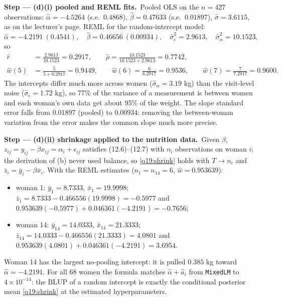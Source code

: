 \documentclass[11pt,a4paper]{article}
\numberwithin{equation}{questao}
\newcommand{\passo}[2]{\par\smallskip\noindent\textbf{Step --- #1.}~#2}
\begin{document}
\begin{sol}
\passo{(d)(i) pooled and REML fits}{Pooled OLS on the $n=427$ observations: $\hat\alpha=-4.5264$ (s.e.\ $0.4868$),
$\hat\beta=0.47633$ (s.e.\ $0.01897$), $\hat\sigma=3.6115$, as on the lecturer's page. REML for the random-intercept model:
\begin{equation*}
\hat\alpha=-4.2191\ (0.4541),\quad \hat\beta=0.46656\ (0.00934),\quad \hat\sigma_\epsilon^2=2.9613,\quad \hat\sigma_\alpha^2=10.1523,
\end{equation*}
so
\begin{align*}
\hat r&=\frac{2.9613}{10.1523}=0.2917,\qquad \hat\rho=\frac{10.1523}{10.1523+2.9613}=0.7742,\\
\hat w(5)&=\frac{5}{5+0.2917}=0.9449,\qquad \hat w(6)=\frac{6}{6.2917}=0.9536,\qquad \hat w(7)=\frac{7}{7.2917}=0.9600 .
\end{align*}
The intercepts differ much more across women ($\hat\sigma_\alpha=3.19$ kg) than the visit-level noise ($\hat\sigma_\epsilon=1.72$
kg), so 77\% of the variance of a measurement is between women and each woman's own data get about 95\% of the
weight. The slope standard error falls from $0.01897$ (pooled) to $0.00934$: removing the between-woman variation
from the error makes the common slope much more precise.}

\passo{(d)(ii) shrinkage applied to the nutrition data}{Given $\beta$, $z_{ij}=y_{ij}-\beta x_{ij}=\alpha_i+\epsilon_{ij}$
satisfies (12.6)--(12.7) with $n_i$ observations on woman $i$; the derivation of (b) never used balance, so
\eqref{q19:shrink} holds with $T\to n_i$ and $\bar z_i=\bar y_i-\beta\bar x_i$. With the REML estimates ($n_1=n_{14}=6$,
$\hat w=0.953639$):
\begin{itemize}[leftmargin=1.4em,topsep=1pt,itemsep=0pt]
\item woman 1: $\bar y_1=8.7333$, $\bar x_1=19.9998$; $\bar z_1=8.7333-0.466556(19.9998)=-0.5977$ and
$0.953639(-0.5977)+0.046361(-4.2191)=-0.7656$;
\item woman 14: $\bar y_{14}=14.0333$, $\bar x_{14}=21.3333$; $\bar z_{14}=14.0333-0.466556(21.3333)=4.0801$ and
$0.953639(4.0801)+0.046361(-4.2191)=3.6954$.
\end{itemize}
Woman 14 has the largest no-pooling intercept: it is pulled $0.385$ kg toward $\hat\alpha=-4.2191$. For all 68
women the formula matches $\hat\alpha+\hat a_i$ from \texttt{MixedLM} to $4\times10^{-14}$: the BLUP of a random intercept is
exactly the conditional posterior mean \eqref{q19:shrink} at the estimated hyperparameters.}


\end{sol}
\end{document}
